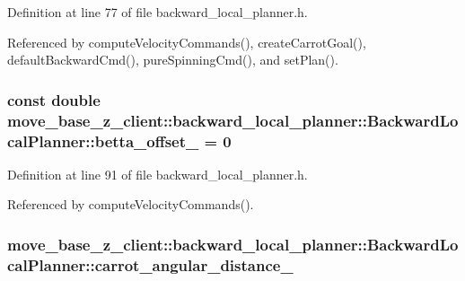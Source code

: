 Definition at line 77 of file backward\+\_\+local\+\_\+planner.\+h.



Referenced by compute\+Velocity\+Commands(), create\+Carrot\+Goal(), default\+Backward\+Cmd(), pure\+Spinning\+Cmd(), and set\+Plan().

\subsubsection[{\texorpdfstring{betta\+\_\+offset\+\_\+}{betta_offset_}}]{\setlength{\rightskip}{0pt plus 5cm}const double move\+\_\+base\+\_\+z\+\_\+client\+::backward\+\_\+local\+\_\+planner\+::\+Backward\+Local\+Planner\+::betta\+\_\+offset\+\_\+ = 0\hspace{0.3cm}{\ttfamily [private]}}\hypertarget{classmove__base__z__client_1_1backward__local__planner_1_1BackwardLocalPlanner_ae35f99afc3c859a4b14d0417ef7839df}{}\label{classmove__base__z__client_1_1backward__local__planner_1_1BackwardLocalPlanner_ae35f99afc3c859a4b14d0417ef7839df}


Definition at line 91 of file backward\+\_\+local\+\_\+planner.\+h.



Referenced by compute\+Velocity\+Commands().

\subsubsection[{\texorpdfstring{carrot\+\_\+angular\+\_\+distance\+\_\+}{carrot_angular_distance_}}]{ move\+\_\+base\+\_\+z\+\_\+client\+::backward\+\_\+local\+\_\+planner\+::\+Backward\+Local\+Planner\+::carrot\+\_\+angular\+\_\+distance\+\_\+\hspace{0.3cm}{\ttfamily [private]}}\hypertarget{classmove__base__z__client_1_1backward__local__planner_1_1BackwardLocalPlanner_a3d6cba0748b85a67f5dfd7740de9530f}{}\label{classmove__base__z__client_1_1backward__local__planner_1_1BackwardLocalPlanner_a3d6cba0748b85a67f5dfd7740de9530f}


